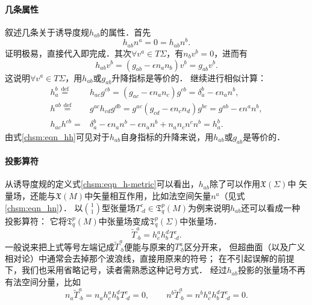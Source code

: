 \paragraph{几条属性}
叙述几条关于诱导度规$h_{ab}$的属性．首先
\begin{equation}\label{chsm:eqn_hn}
    h_{ab}{n}^a=0=h_{ab}{n}^b.
\end{equation}
证明极易，直接代入即完成．其次$\forall v^a \in T\Sigma$，有${n}_b v^b=0$，进而有
\begin{equation}
    h_{ab}v^b = (g_{ab}-\epsilon {n}_a {n}_b)v^b=g_{ab}v^b.
\end{equation}
这说明$\forall v^a \in T\Sigma$，用$h_{ab}$或$g_{ab}$升降指标是等价的．
继续进行相似计算：%
\begin{align}
    h_a^b\overset{\mathrm {def}}{=}&h_{ac}g^{cb} =(g_{ac}-\epsilon {n}_a {n}_c)g^{cb}
      =\delta_a^b -\epsilon {n}_a {n}^b,  \label{chsm:eqn_hdaub} \\
    h^{ab}\overset{\mathrm {def}}{=}&g^{ac}h_{cd}g^{db} =g^{ac}(g_{cd}-\epsilon {n}_c {n}_d)g^{bc}
      = g^{ab}-\epsilon{n}^a {n}^b, \label{chsm:eqn_huaub} \\
    h_{ac}h^{cb}=&\delta_a^b-\epsilon {n}_a {n}^b-\epsilon{n}_a {n}^b
        + {n}_a {n}_c{n}^c {n}^b    =h_a^b . \label{chsm:eqn_hh}
\end{align} %
由式\eqref{chsm:eqn_hh}可见对于$h_{ab}$自身指标的升降来说，用$h_{ab}$或$g_{ab}$是等价的．

\paragraph{投影算符}
从诱导度规的定义式\eqref{chsm:eqn_h-metric}可以看出，$h_{ab}$除了可以作用$\mathfrak{X}(\Sigma)$中
矢量场，还能与$\mathfrak{X}(M)$中矢量相互作用，比如法空间矢量${n}^a$（见式\eqref{chsm:eqn_hn}）．
以$\binom{1}{1}$型张量场$T^c_{\cdot d}\in \mathfrak{T}^p_q(M)$为例来说明$h_{ab}$还可以看成一种{\heiti 投影算符}：
它将$\mathfrak{T}^p_q(M)$中张量场变成$\mathfrak{T}^p_q(\Sigma)$中张量场．
\begin{equation}
    \widetilde{T}^a_{\cdot b} = h^a_c  h^d_ b T^c_{\cdot d} .
\end{equation}
一般说来把上式等号左端记成$\widetilde{T}^a_{\cdot b}$便能与原来的${T}^a_{\cdot b}$区分开来，
但超曲面（以及广义相对论）中通常会去掉那个波浪线，直接用原来的符号；
在不引起误解的前提下，我们也采用省略记号，读者需熟悉这种记号方式．
经过$h_{ab}$投影的张量场不再有法空间分量，比如
\begin{equation}
    {n}_a \widetilde{T}^a_{\cdot b}= {n}_a h^a_c  h^d_ b T^c_{\cdot d}=0, \qquad
    {n}^b \widetilde{T}^a_{\cdot b}= {n}^b h^a_c  h^d_ b T^c_{\cdot d}=0.
\end{equation}

